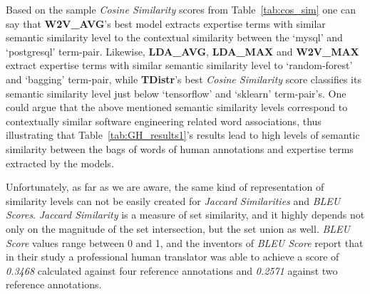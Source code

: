             \begin{table}
                  \centering
                  \caption{Example of Cosine Similarity Scores between Term-Pairs.} \label{tab:cos_sim}
                  \vspace{6pt} %
            \end{table}
            
            Based on the sample \emph{Cosine Similarity} scores from Table~\ref{tab:cos_sim} one can say that \textbf{W2V\_AVG}'s best model extracts expertise terms with similar semantic similarity level to the contextual similarity between the `mysql' and `postgresql' term-pair. Likewise, \textbf{LDA\_AVG}, \textbf{LDA\_MAX} and \textbf{W2V\_MAX} extract expertise terms with similar semantic similarity level to `random-forest' and `bagging' term-pair, while \textbf{TDistr}'s best \emph{Cosine Similarity} score classifies its semantic similarity level just below `tensorflow' and `sklearn' term-pair's. One could argue that the above mentioned semantic similarity levels correspond to contextually similar software engineering related word associations, thus illustrating that Table~\ref{tab:GH_results1}'s results lead to high levels of semantic similarity between the bags of words of human annotations and expertise terms extracted by the models.
            
            Unfortunately, as far as we are aware, the same kind of representation of similarity levels can not be easily created for \emph{Jaccard Similarities} and \emph{BLEU Scores}. \emph{Jaccard Similarity} is a measure of set similarity, and it highly depends not only on the magnitude of the set intersection, but the set union as well. \emph{BLEU Score} values range between 0 and 1, and the inventors of \emph{BLEU Score} report that in their study a professional human translator was able to achieve a score of \emph{0.3468} calculated against four reference annotations and \emph{0.2571} against two reference annotations\cite{papineni2002bleu}.
        
